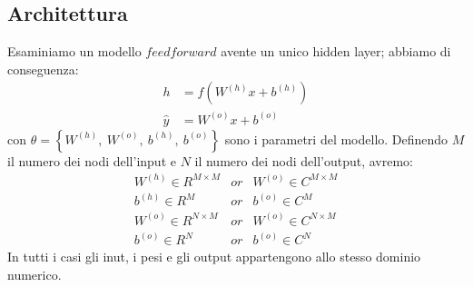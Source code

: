 \documentclass[a4paper,10pt]{article}
\begin{document}
\subsection{Architettura}
Esaminiamo un modello $feedforward$ avente un unico hidden layer; abbiamo di conseguenza:
\begin{align}
 h &= f\left(W^{\left(h\right)}x+b^{\left(h\right)}\right)\\
 \widehat{y} &= W^{\left(o\right)}x+b^{\left(o\right)}
\end{align}
con $\theta = \left \{ W^{\left(h\right)}, \ W^{\left(o\right)}, \ b^{\left(h\right)}, \ b^{\left(o\right)}\right \}$ sono i parametri del modello. Definendo $M$ il numero dei nodi dell'input e $N$ il numero dei nodi dell'output, avremo:
\begin{equation}
 \begin{matrix}
  W^{\left( h\right) } \in R^{M\times M} & or & W^{\left( o\right) } \in C^{M\times M}\\
  b^{\left( h\right) } \in R^M & or & b^{\left( o\right) } \in C^M\\
  W^{\left( o\right) } \in R^{N\times M} & or & W^{\left( o\right) } \in C^{N\times M}\\
  b^{\left( o\right) } \in R^N & or & b^{\left( o\right) } \in C^N
 \end{matrix}
\end{equation}
In tutti i casi gli inut, i pesi e gli output appartengono allo stesso dominio numerico.
\end{document}
